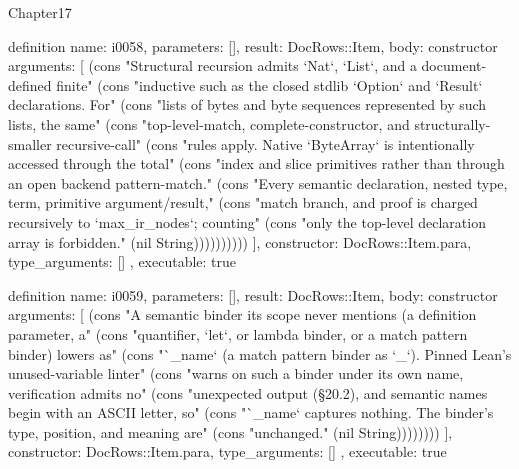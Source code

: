 \begin{lexlean}{Chapter17}
\begin{semanticmodule}
definition{
  name: i0058,
  parameters: [],
  result: DocRows::Item,
  body: constructor{
    arguments: [
      (cons "Structural recursion admits `Nat`, `List`, and a document-defined finite" (cons "inductive such as the closed stdlib `Option` and `Result` declarations. For" (cons "lists of bytes and byte sequences represented by such lists, the same" (cons "top-level-match, complete-constructor, and structurally-smaller recursive-call" (cons "rules apply. Native `ByteArray` is intentionally accessed through the total" (cons "index and slice primitives rather than through an open backend pattern-match." (cons "Every semantic declaration, nested type, term, primitive argument/result," (cons "match branch, and proof is charged recursively to `max_ir_nodes`; counting" (cons "only the top-level declaration array is forbidden." (nil String))))))))))
    ],
    constructor: DocRows::Item.para,
    type_arguments: []
  },
  executable: true
}

definition{
  name: i0059,
  parameters: [],
  result: DocRows::Item,
  body: constructor{
    arguments: [
      (cons "A semantic binder its scope never mentions (a definition parameter, a" (cons "quantifier, `let`, or lambda binder, or a match pattern binder) lowers as" (cons "`_name` (a match pattern binder as `_`). Pinned Lean's unused-variable linter" (cons "warns on such a binder under its own name, verification admits no" (cons "unexpected output (§20.2), and semantic names begin with an ASCII letter, so" (cons "`_name` captures nothing. The binder's type, position, and meaning are" (cons "unchanged." (nil String))))))))
    ],
    constructor: DocRows::Item.para,
    type_arguments: []
  },
  executable: true
}


\end{semanticmodule}
\end{lexlean}
